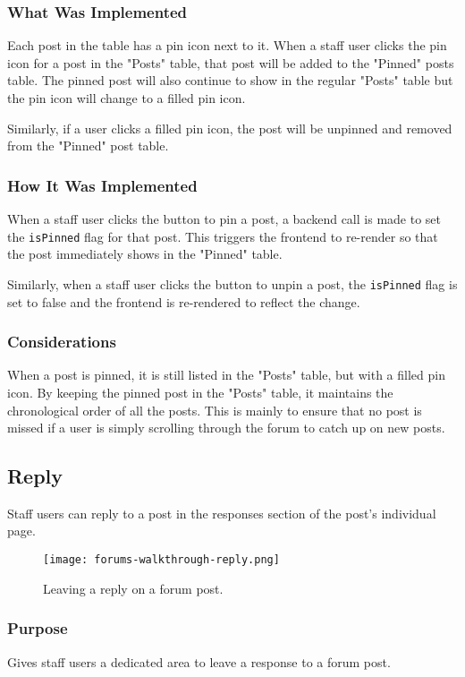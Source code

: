 \subsubsection{What Was Implemented}
Each post in the table has a pin icon next to it.
When a staff user clicks the pin icon for a post in the "Posts" table, that post will be added to the "Pinned" posts table.
The pinned post will also continue to show in the regular "Posts" table but the pin icon will change to a filled pin icon.

Similarly, if a user clicks a filled pin icon, the post will be unpinned and removed from the "Pinned" post table.

\subsubsection{How It Was Implemented}
When a staff user clicks the button to pin a post, a backend call is made to set the \texttt{isPinned} flag for that post.
This triggers the frontend to re-render so that the post immediately shows in the "Pinned" table.

Similarly, when a staff user clicks the button to unpin a post, the \texttt{isPinned} flag is set to false and the frontend is re-rendered to reflect the change.

\subsubsection{Considerations}
When a post is pinned, it is still listed in the "Posts" table, but with a filled pin icon.
By keeping the pinned post in the "Posts" table, it maintains the chronological order of all the posts.
This is mainly to ensure that no post is missed if a user is simply scrolling through the forum to catch up on new posts.

\subsection{Reply}
Staff users can reply to a post in the responses section of the post's individual page.

\begin{figure}[h!]
    \texttt{[image: forums-walkthrough-reply.png]}
    \centering
    \caption{Leaving a reply on a forum post.}
\end{figure}

\subsubsection{Purpose}
Gives staff users a dedicated area to leave a response to a forum post.

